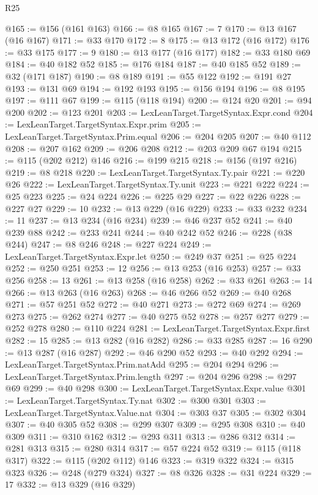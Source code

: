 \begin{lexlean}{R25}
\begin{coremodule}
{{{{{{{{{{{{{{{{{{{{{{{{{{{{{{{{{{{{{{{{{{{{{{{{{{{{{@165 := @156 (@161 @163)
@166 := @8 @165
@167 := 7
@170 := @13 @167 (@16 @167)
@171 := @33 @170
@172 := 8
@175 := @13 @172 (@16 @172)
@176 := @33 @175
@177 := 9
@180 := @13 @177 (@16 @177)
@182 := @33 @180 @69
@184 := @40 @182 @52
@185 := @176 @184
@187 := @40 @185 @52
@189 := @32 (@171 @187)
@190 := @8 @189
@191 := @55 @122
@192 := @191 @27
@193 := @131 @69
@194 := @192 @193
@195 := @156 @194
@196 := @8 @195
@197 := @111 @67
@199 := @115 (@118 @194)
@200 := @124 @20
@201 := @94 @200
@202 := @123 @201
@203 := LexLeanTarget.TargetSyntax.Expr.cond
@204 := LexLeanTarget.TargetSyntax.Expr.prim
@205 := LexLeanTarget.TargetSyntax.Prim.equal
@206 := @204 @205
@207 := @40 @112
@208 := @207 @162
@209 := @206 @208
@212 := @203 @209 @67 @194
@215 := @115 (@202 @212) @146
@216 := @199 @215
@218 := @156 (@197 @216)
@219 := @8 @218
@220 := LexLeanTarget.TargetSyntax.Ty.pair
@221 := @220 @26
@222 := LexLeanTarget.TargetSyntax.Ty.unit
@223 := @221 @222
@224 := @25 @223
@225 := @24 @224
@226 := @225 @29
@227 := @22 @226
@228 := @227 @27
@229 := 10
@232 := @13 @229 (@16 @229)
@233 := @33 @232
@234 := 11
@237 := @13 @234 (@16 @234)
@239 := @46 @237 @52
@241 := @40 @239 @88
@242 := @233 @241
@244 := @40 @242 @52
@246 := @228 (@38 @244)
@247 := @8 @246
@248 := @227 @224
@249 := LexLeanTarget.TargetSyntax.Expr.let
@250 := @249 @37
@251 := @25 @224
@252 := @250 @251
@253 := 12
@256 := @13 @253 (@16 @253)
@257 := @33 @256
@258 := 13
@261 := @13 @258 (@16 @258)
@262 := @33 @261
@263 := 14
@266 := @13 @263 (@16 @263)
@268 := @46 @266 @52
@269 := @40 @268
@271 := @57 @251 @52
@272 := @40 @271
@273 := @272 @69
@274 := @269 @273
@275 := @262 @274
@277 := @40 @275 @52
@278 := @257 @277
@279 := @252 @278
@280 := @110 @224
@281 := LexLeanTarget.TargetSyntax.Expr.first
@282 := 15
@285 := @13 @282 (@16 @282)
@286 := @33 @285
@287 := 16
@290 := @13 @287 (@16 @287)
@292 := @46 @290 @52
@293 := @40 @292
@294 := LexLeanTarget.TargetSyntax.Prim.natAdd
@295 := @204 @294
@296 := LexLeanTarget.TargetSyntax.Prim.length
@297 := @204 @296
@298 := @297 @69
@299 := @40 @298
@300 := LexLeanTarget.TargetSyntax.Expr.value
@301 := LexLeanTarget.TargetSyntax.Ty.nat
@302 := @300 @301
@303 := LexLeanTarget.TargetSyntax.Value.nat
@304 := @303 @37
@305 := @302 @304
@307 := @40 @305 @52
@308 := @299 @307
@309 := @295 @308
@310 := @40 @309
@311 := @310 @162
@312 := @293 @311
@313 := @286 @312
@314 := @281 @313
@315 := @280 @314
@317 := @57 @224 @52
@319 := @115 (@118 @317)
@322 := @115 (@202 @112) @146
@323 := @319 @322
@324 := @315 @323
@326 := @248 (@279 @324)
@327 := @8 @326
@328 := @31 @224
@329 := 17
@332 := @13 @329 (@16 @329)
}}}}}}}}}}}}}}}}}}}}}}}}}}}}}}}}}}}}}}}}}}}}}}}}}}}}}
\end{coremodule}
\end{lexlean}
